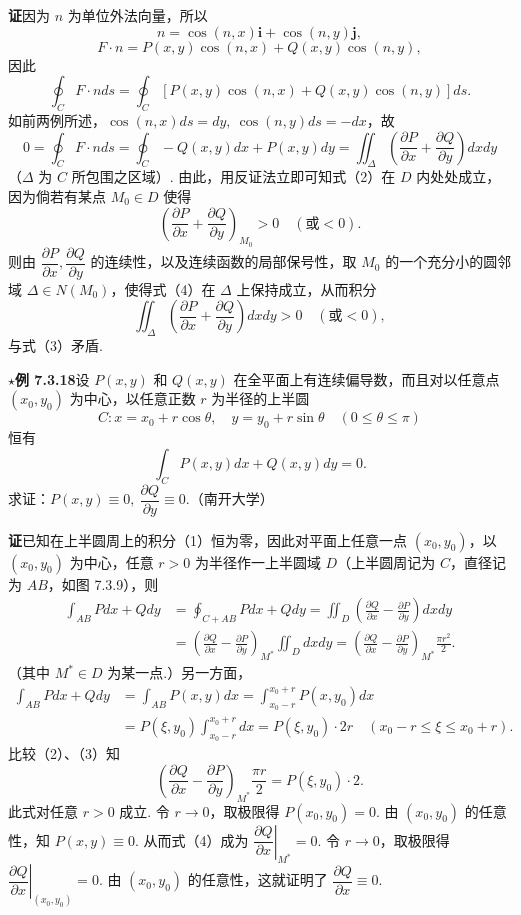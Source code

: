 \documentclass[UTF8, 12pt, fontset=fandol, oneside]{ctexart}
\begin{document}
\noindent\textbf{证}\quad 因为 $n$ 为单位外法向量，所以
\[
n=\cos(n,x)\boldsymbol i+\cos(n,y)\boldsymbol j,
\]
\[
F\cdot n=P(x,y)\cos(n,x)+Q(x,y)\cos(n,y),
\]
因此
\[
\oint_CF\cdot nds
=\oint_C[P(x,y)\cos(n,x)+Q(x,y)\cos(n,y)]ds.
\]
如前两例所述，$\cos(n,x)ds=dy,\ \cos(n,y)ds=-dx$，故
\[
0=\oint_CF\cdot nds=\oint_C-Q(x,y)dx+P(x,y)dy
=\iint_\Delta\left(\frac{\partial P}{\partial x}
+\frac{\partial Q}{\partial y}\right)dxdy \tag{3}
\]
（$\Delta$ 为 $C$ 所包围之区域）.
由此，用反证法立即可知式（2）在 $D$ 内处处成立，因为倘若有某点 $M_0\in D$ 使得
\[
\left(\frac{\partial P}{\partial x}+\frac{\partial Q}{\partial y}\right)_{M_0}>0
\quad(\text{或}<0). \tag{4}
\]
则由 $\dfrac{\partial P}{\partial x},\dfrac{\partial Q}{\partial y}$ 的连续性，以及连续函数的局部保号性，取 $M_0$ 的一个充分小的圆邻域 $\Delta\in N(M_0)$，使得式（4）在 $\Delta$ 上保持成立，从而积分
\[
\iint_\Delta\left(\frac{\partial P}{\partial x}
+\frac{\partial Q}{\partial y}\right)dxdy>0\quad(\text{或}<0),
\]
与式（3）矛盾.

\noindent\textbf{$\star$例 7.3.18}\quad 设 $P(x,y)$ 和 $Q(x,y)$ 在全平面上有连续偏导数，而且对以任意点 $(x_0,y_0)$ 为中心，以任意正数 $r$ 为半径的上半圆
\[
C:x=x_0+r\cos\theta,\quad y=y_0+r\sin\theta\quad(0\le\theta\le\pi)
\]
恒有
\[
\int_CP(x,y)dx+Q(x,y)dy=0. \tag{1}
\]
求证：$P(x,y)\equiv0,\ \dfrac{\partial Q}{\partial y}\equiv0$.（南开大学）

\noindent\textbf{证}\quad 已知在上半圆周上的积分（1）恒为零，因此对平面上任意一点 $(x_0,y_0)$，以 $(x_0,y_0)$ 为中心，任意 $r>0$ 为半径作一上半圆域 $D$（上半圆周记为 $C$，直径记为 $AB$，如图 7.3.9），则
\begin{equation}
\begin{aligned}
\int_{AB}Pdx+Qdy
&=\oint_{C+AB}Pdx+Qdy
=\iint_D\left(\frac{\partial Q}{\partial x}
-\frac{\partial P}{\partial y}\right)dxdy\\
&=\left(\frac{\partial Q}{\partial x}
-\frac{\partial P}{\partial y}\right)_{M^*}\iint_Ddxdy
=\left(\frac{\partial Q}{\partial x}
-\frac{\partial P}{\partial y}\right)_{M^*}\frac{\pi r^2}{2}.
\end{aligned}
\tag{2}
\end{equation}
（其中 $M^*\in D$ 为某一点.）另一方面，
\begin{equation}
\begin{aligned}
\int_{AB}Pdx+Qdy
&=\int_{AB}P(x,y)dx
=\int_{x_0-r}^{x_0+r}P(x,y_0)dx\\
&=P(\xi,y_0)\int_{x_0-r}^{x_0+r}dx
=P(\xi,y_0)\cdot2r\quad(x_0-r\le\xi\le x_0+r).
\end{aligned}
\tag{3}
\end{equation}
比较（2）、（3）知
\[
\left(\frac{\partial Q}{\partial x}
-\frac{\partial P}{\partial y}\right)_{M^*}\frac{\pi r}{2}
=P(\xi,y_0)\cdot2. \tag{4}
\]
此式对任意 $r>0$ 成立. 令 $r\to0$，取极限得 $P(x_0,y_0)=0$. 由 $(x_0,y_0)$ 的任意性，知 $P(x,y)\equiv0$. 从而式（4）成为 $\left.\dfrac{\partial Q}{\partial x}\right|_{M^*}=0$. 令 $r\to0$，取极限得 $\left.\dfrac{\partial Q}{\partial x}\right|_{(x_0,y_0)}=0$. 由 $(x_0,y_0)$ 的任意性，这就证明了 $\dfrac{\partial Q}{\partial x}\equiv0$.
\end{document}
